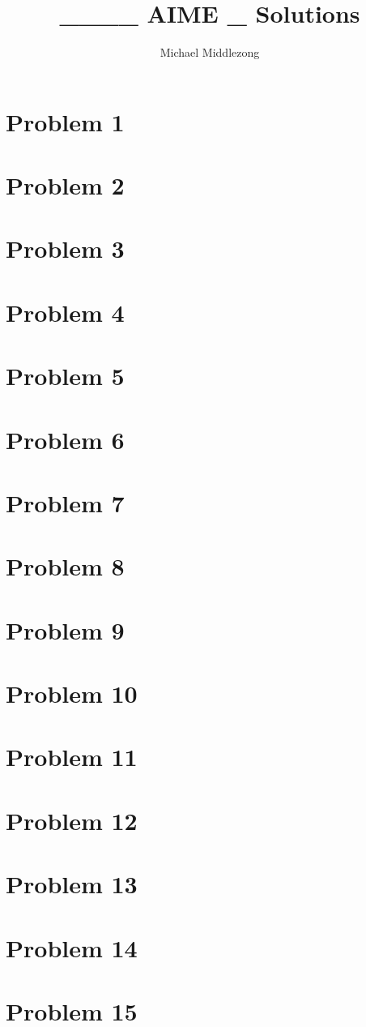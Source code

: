 \documentclass{scrartcl}
\title{____ AIME _ Solutions}
\author{Michael Middlezong}
\begin{document}
\maketitle

\section*{Problem 1}

\section*{Problem 2}
\section*{Problem 3}
\section*{Problem 4}
\section*{Problem 5}
\section*{Problem 6}
\section*{Problem 7}
\section*{Problem 8}
\section*{Problem 9}
\section*{Problem 10}
\section*{Problem 11}
\section*{Problem 12}
\section*{Problem 13}
\section*{Problem 14}
\section*{Problem 15}
\end{document}
